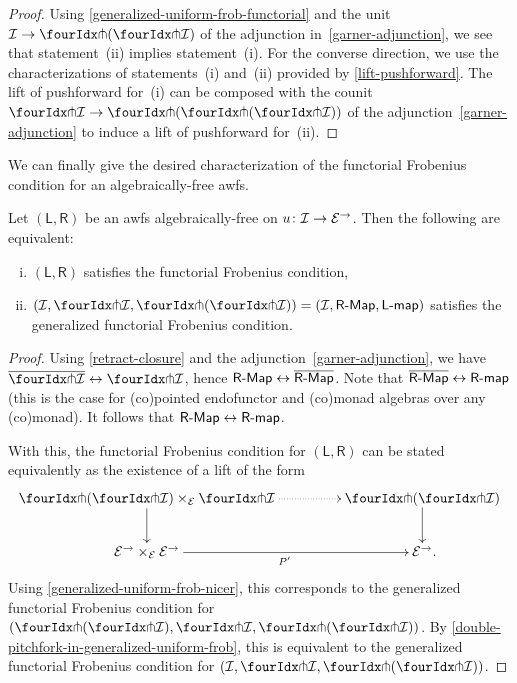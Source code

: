 \documentclass[reqno,10pt,a4paper,oneside,draft]{amsart}
\newcommand{\LL}{\mathsf{L}}
\newcommand{\RR}{\mathsf{R}}
\begin{document}
{{\begin{proof}
Using \cref{generalized-uniform-frob-functorial} and the unit $\cal{I} \to \liftl{(\liftr{\cal{I}})}$ of the adjunction in~\eqref{garner-adjunction}, we see that statement~(ii) implies statement~(i).
For the converse direction, we use the characterizations of statements~(i) and~(ii) provided by \cref{lift-pushforward}.
The lift of pushforward for~(i) can be composed with the counit $\liftr{\cal{I}} \to \liftr{(\liftl{(\liftr{\cal{I}})})}$ of the adjunction~\eqref{garner-adjunction} to induce a lift of pushforward for~(ii).
\end{proof}

We can finally give the desired characterization of the functorial Frobenius condition for an algebraically-free awfs.

\begin{theorem} \label{thm:frobenius-comparison}
Let $(\LL, \RR)$ be an awfs algebraically-free on $u \colon \mathcal{I} \to \mathcal{E}^\to$.
Then the following are equivalent:
\begin{enumerate}[(i)]
\item $(\LL, \RR)$ satisfies the functorial Frobenius condition,
\item $(\cal{I}, \liftr{\cal{I}}, \liftl{(\liftr{\cal{I}})}) = (\cal{I}, \pAlg{\RR}, \pcoalg{\LL})$ satisfies the generalized functorial Frobenius condition.
\end{enumerate}
\end{theorem}

\begin{proof}
Using \cref{retract-closure} and the adjunction~\eqref{garner-adjunction}, we have $\overline{\liftr{\cal{I}}} \leftrightarrow \liftr{\cal{I}}$, hence $\pAlg{\RR} \leftrightarrow \overline{\pAlg{\RR}}$.
Note that $\overline{\pAlg{\RR}} \leftrightarrow \palg{\RR}$ (this is the case for (co)pointed endofunctor and (co)monad algebras over any (co)monad).
It follows that $\pAlg{\RR} \leftrightarrow \palg{\RR}$.

With this, the functorial Frobenius condition for $(\LL, \RR)$ can be stated equivalently as the existence of a lift of the form
\begin{equation} \label{frobenius-comparison:0}
\begin{gathered}
\xymatrix@C+2em{
  \liftl{(\liftr{\cal{I}})} \times_{\cal{E}} \liftr{\cal{I}}
  \ar@{.>}[r]
  \ar[d]
&
  \liftl{(\liftr{\cal{I}})}
  \ar[d]
\\
  \cal{E}^\to \times_{\cal{E}} \cal{E}^\to
  \ar[r]_{P'}
&
  \cal{E}^\to
\rlap{.}}
\end{gathered}
\end{equation}
Using \cref{generalized-uniform-frob-nicer}, this corresponds to the generalized functorial Frobenius condition for $(\liftl{(\liftr{\cal{I}})}, \liftr{\cal{I}}, \liftl{(\liftr{\cal{I}})})$.
By \cref{double-pitchfork-in-generalized-uniform-frob}, this is equivalent to the generalized functorial Frobenius condition for $(\cal{I}, \liftr{\cal{I}}, \liftl{ (  \liftr{\cal{I}} ) }   )$.
\end{proof}

}}
\end{document}
